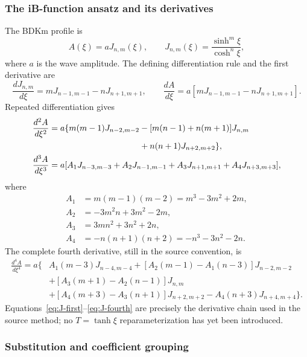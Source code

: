 \documentclass[11pt]{article}
\begin{document}
\subsubsection{The iB-function ansatz and its derivatives}

The BDKm profile is
\begin{equation}
\label{eq:ansatz}
A(\xi)=aJ_{n,m}(\xi),\qquad
J_{n,m}(\xi)=\frac{\sinh^m\xi}{\cosh^n\xi},
\end{equation}
where $a$ is the wave amplitude.  The defining differentiation rule and the
first derivative are
\begin{equation}
\frac{dJ_{n,m}}{d\xi}=mJ_{n-1,m-1}-nJ_{n+1,m+1},\qquad
\frac{dA}{d\xi}=a[mJ_{n-1,m-1}-nJ_{n+1,m+1}].
\label{eq:J-first}
\end{equation}
Repeated differentiation gives
\begin{align}
\frac{d^2A}{d\xi^2}={}&a\{m(m-1)J_{n-2,m-2}
-[m(n-1)+n(m+1)]J_{n,m}\nonumber\\
&\hspace{33mm}+n(n+1)J_{n+2,m+2}\},
\label{eq:J-second}\\
\frac{d^3A}{d\xi^3}={}&a[A_1J_{n-3,m-3}+A_2J_{n-1,m-1}
+A_3J_{n+1,m+1}+A_4J_{n+3,m+3}],
\label{eq:J-third}
\end{align}
where
\begin{align}
A_1&=m(m-1)(m-2)=m^3-3m^2+2m,\nonumber\\
A_2&=-3m^2n+3m^2-2m,\nonumber\\
A_3&=3mn^2+3n^2+2n,\nonumber\\
A_4&=-n(n+1)(n+2)=-n^3-3n^2-2n.
\label{eq:A-coefficients}
\end{align}
The complete fourth derivative, still in the source convention, is
\begin{align}
\frac{d^4A}{d\xi^4}=a\{&A_1(m-3)J_{n-4,m-4}
+[A_2(m-1)-A_1(n-3)]J_{n-2,m-2}\nonumber\\
&+[A_3(m+1)-A_2(n-1)]J_{n,m}\nonumber\\
&+[A_4(m+3)-A_3(n+1)]J_{n+2,m+2}
-A_4(n+3)J_{n+4,m+4}\}.
\label{eq:J-fourth}
\end{align}
Equations~\eqref{eq:J-first}--\eqref{eq:J-fourth} are precisely the derivative
chain used in the source method; no $T=\tanh\xi$ reparameterization has yet
been introduced.

\subsubsection{Substitution and coefficient grouping}
\end{document}
